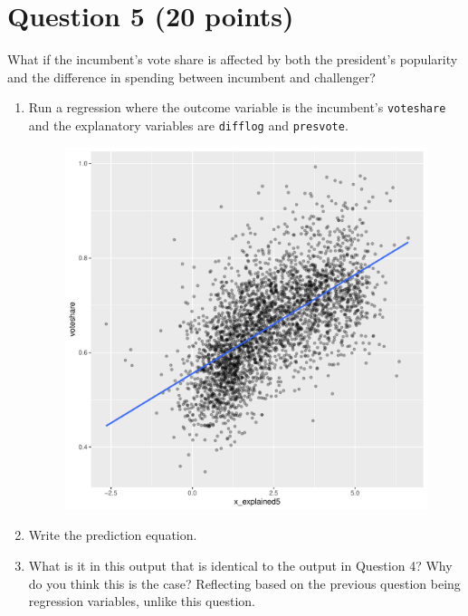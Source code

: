 \documentclass[12pt,letterpaper]{article}
\begin{document}
\section*{Question 5 (20 points)}
\noindent What if the incumbent's vote share is affected by both the president's popularity and the difference in spending between incumbent and challenger? 
	\begin{enumerate}
		\item Run a regression where the outcome variable is the incumbent's \texttt{voteshare} and the explanatory variables are \texttt{difflog} and \texttt{presvote}.
		\begin{figure}[h!]\centering
			\caption{\footnotesize
			}\vspace{-1cm}
			\includegraphics[width=.75\textwidth]{plot_Q5.pdf}\\
		\end{figure}
	
		\item Write the prediction equation.
		
		
		\item What is it in this output that is identical to the output in Question 4? Why do you think this is the case?	
		\vspace{5cm}
Reflecting based on the previous question being regression variables, unlike this question.
	\end{enumerate}
\end{document}
